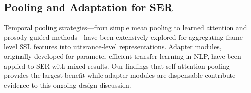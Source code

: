 \subsection{Pooling and Adaptation for SER}

Temporal pooling strategies---from simple mean pooling to learned attention and prosody-guided methods---have been extensively explored for aggregating frame-level SSL features into utterance-level representations. Adapter modules, originally developed for parameter-efficient transfer learning in NLP, have been applied to SER with mixed results. Our findings that self-attention pooling provides the largest benefit while adapter modules are dispensable contribute evidence to this ongoing design discussion.

